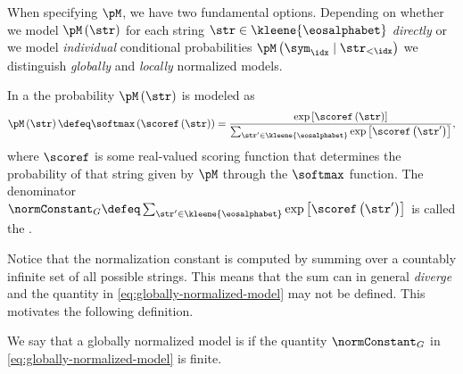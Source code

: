 When specifying $\pM$, we have two fundamental options.
Depending on whether we model $\pM\left(\str\right)$ for each string $\str \in \kleene{\eosalphabet}$ \emph{directly} or we model \emph{individual} conditional probabilities $\pM\left(\sym_\idx \mid \str_{<\idx}\right)$ we distinguish \emph{globally} and \emph{locally} normalized models.

\begin{definition}  \label{def:globally-normalized-model}
    In a  the probability $\pM\left(\str\right)$ is modeled as 
    \begin{equation} \label{eq:globally-normalized-model}
        \pM\left(\str\right) \defeq \softmax\left(\scoref\left(\str\right)\right) = \frac{\exp\left[\scoref\left(\str\right)\right]}{\sum_{\str' \in \kleene{\eosalphabet}}\exp\left[\scoref\left(\str'\right)\right]},
    \end{equation}
    where $\scoref$ is some real-valued scoring function that determines the probability of that string given by $\pM$ through the $\softmax$ function.
    The denominator $\normConstant_G \defeq \sum_{\str' \in \kleene{\eosalphabet}}\exp\left[\scoref\left(\str'\right)\right]$ is called the .
\end{definition}
Notice that the normalization constant is computed by summing over a countably infinite set of all possible strings. 
This means that the sum can in general \emph{diverge} and the quantity in \cref{eq:globally-normalized-model} may not be defined. 
This motivates the following definition.
\begin{definition}
    We say that a globally normalized model is  if the quantity $\normConstant_G$ in \cref{eq:globally-normalized-model} is finite.
\end{definition}

